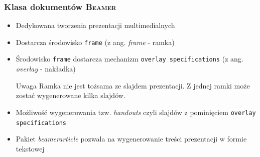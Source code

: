 \documentclass[t]{beamer}
\newcommand{\beamer}{
{\rmfamily\textsc{Beamer}}
}
\begin{document}
\begin{frame}
	\frametitle{Klasa dokumentów \beamer\ }
	\begin{itemize}
		\item Dedykowana tworzenia prezentacji multimedialnych
		\item Dostarcza środowisko \texttt{frame} (z ang. \emph{frame}  - ramka)
		\item Środowisko \texttt{frame} dostarcza mechanizm \texttt{overlay specifications} (z ang. \emph{overlay} - nakładka)
		\begin{alertblock}{Uwaga}
			Ramka nie jest tożsama ze slajdem prezentacji. Z jednej ramki może zostać wygenerowane kilka slajdów.
		\end{alertblock}
		\item Możliwość wygenerowania tzw. \emph{handouts} czyli slajdów z pominięciem \texttt{overlay specifications} 
		\item Pakiet \emph{beamerarticle} pozwala na wygenerowanie treści prezentacji w formie tekstowej
	\end{itemize}
\end{frame}
\end{document}
